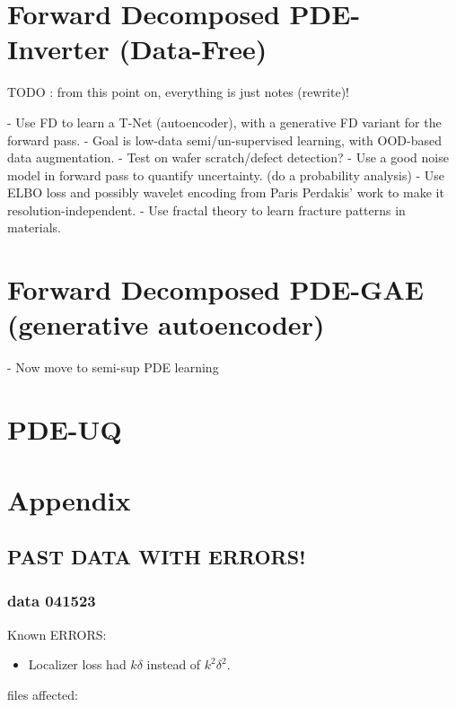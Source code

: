 

\section{Forward Decomposed PDE-Inverter (Data-Free)}

TODO : from this point on, everything is just notes (rewrite)! 


\newpage

- Use FD to learn a T-Net (autoencoder), with a generative FD variant for the forward pass.
- Goal is low-data semi/un-supervised learning, with OOD-based data augmentation.
- Test on wafer scratch/defect detection?
- Use a good noise model in forward pass to quantify uncertainty. (do a probability analysis)
- Use ELBO loss and possibly wavelet encoding from Paris Perdakis' work to make it resolution-independent.
- Use fractal theory to learn fracture patterns in materials.

\section{Forward Decomposed PDE-GAE (generative autoencoder)}
- Now move to semi-sup PDE learning

\section{PDE-UQ}

\section{Appendix}
\subsection{PAST DATA WITH ERRORS!}
\subsubsection{data 041523}
Known ERRORS:
\begin{itemize}
    \item Localizer loss had $k\delta$ instead of $k^2 \delta^2$. 
\end{itemize}
files affected:

